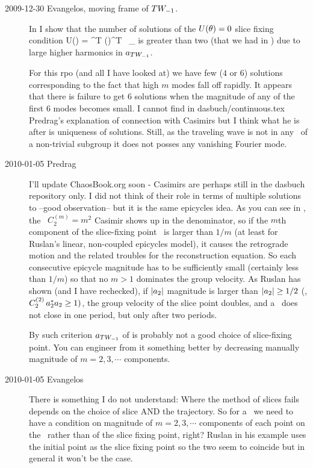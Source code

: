 \begin{description}

\item[2009-12-30 Evangelos, moving frame of $TW_{-1}$.]
In  I show that the number of
solutions of the $U(\theta) = 0$ slice fixing condition \beq
U(\gSpace) = \ssp^T \LieElrep(\gSpace)^T \Lg \,
\ssp_{}  is greater than two (that
we had in \cLe) due to large higher harmonics in
$a_{TW_{-1}}$.

For this rpo (and all I have looked at) we have few ($4$ or
$6$) solutions corresponding to the fact that high $m$ modes
fall off rapidly. It appears that there is failure to get $6$
solutions when the magnitude of any of the first $6$ modes
becomes small. I cannot find in dasbuch/continuous.tex
Predrag's explanation of connection with Casimirs but I think
what he is after is uniqueness of solutions. Still, as the
traveling wave is not in any \fixedsp\ of a non-trivial
subgroup it does not posses any vanishing Fourier mode.

\item[2010-01-05 Predrag] I'll update ChaosBook.org soon -
Casimirs are perhaps still in the dasbuch repository only. I
did not think of their role in terms of multiple solutions to
 --good observation-- but it is the same
epicycles idea. As you can see in , the
\ $C_2^{(m)} = m^2$ Casimir shows up in the
denominator, so if the $m$th component of the slice-fixing
point \slicep\ is larger than $1/m$ (at least for Ruslan's
linear, non-coupled epicycles model), it causes the
retrograde motion and the related troubles for the
reconstruction equation. So each consecutive epicycle
magnitude has to be sufficiently small (certainly less than
$1/m$) so that no $m>1$ dominates the group velocity. As
Ruslan has shown (and I have rechecked), if $|a_2|$
magnitude is larger than $|a_2| \geq 1/2$ (\ie, $C_2^{(2)}\,
a_2^* a_2 \geq 1)$, the group velocity of the slice
point doubles, and a \rpo\ does not close in one period, but
only after two periods.

By such criterion $a_{TW_{-1}}$ of
 is probably not a good choice of
slice-fixing point. You can engineer from it something better by
decreasing manually magnitude of $m=2,3,\cdots$ components.

\item[2010-01-05 Evangelos] There is something I do not
understand: Where the method of slices fails depends on the
choice of slice AND the trajectory. So for a \rpo\ we need to
have a condition on magnitude of $m=2,3,\cdots$ components of
each point on the \rpo\ rather than of the slice fixing
point, right? Ruslan in his example uses the initial point as
the slice fixing point so the two seem to coincide but in
general it won't be the case.


\end{description}
